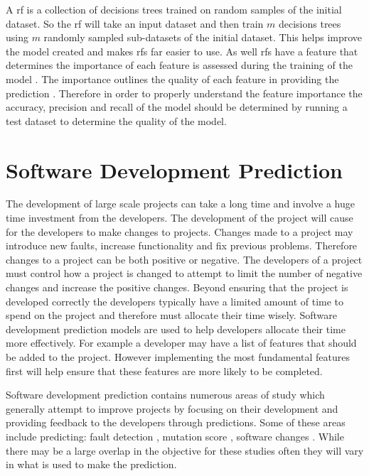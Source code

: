 A \gls{rf} is a collection of decisions trees trained on random samples of the initial dataset. So the \gls{rf} will take an input dataset and then train $m$ decisions trees using $m$ randomly sampled sub-datasets of the initial dataset. This helps improve the model created and makes \gls{rf}s far easier to use. As well \gls{rf}s have a feature that determines the importance of each feature is assessed during the training of the model \cite{Westland2011}. The importance outlines the quality of each feature in providing the prediction \cite{Verikas2011}. Therefore in order to properly understand the feature importance the accuracy, precision and recall of the model should be determined by running a test dataset to determine the quality of the model.

\section{Software Development Prediction}

The development of large scale projects can take a long time and involve a huge time investment from the developers. The development of the project will cause for the developers to make changes to projects. Changes made to a project may introduce new faults, increase functionality and fix previous problems. Therefore changes to a project can be both positive or negative. The developers of a project must control how a project is changed to attempt to limit the number of negative changes and increase the positive changes. Beyond ensuring that the project is developed correctly the developers typically have a limited amount of time to spend on the project and therefore must allocate their time wisely. Software development prediction models are used to help developers allocate their time more effectively. For example a developer may have a list of features that should be added to the project. However implementing the most fundamental features first will help ensure that these features are more likely to be completed.

Software development prediction contains numerous areas of study which generally attempt to improve projects by focusing on their development and providing feedback to the developers through predictions. Some of these areas include predicting: fault detection \cite{Nagappan2007, Moser2008, Thwin2005, Sisman2012}, mutation score \cite{Jalbert2012}, software changes \cite{Bantelay2013, Chaturvedi2014, Giger2012, Hassan2004, Kagdi2007, Ying2004}. While there may be a large overlap in the objective for these studies often they will vary in what is used to make the prediction.

